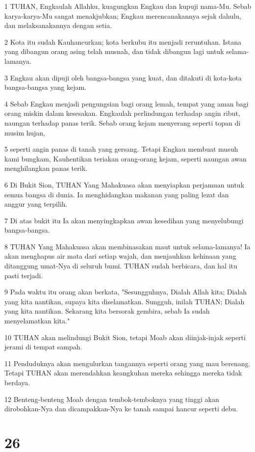 \par 1 TUHAN, Engkaulah Allahku, kuagungkan Engkau dan kupuji nama-Mu. Sebab karya-karya-Mu sangat menakjubkan; Engkau merencanakannya sejak dahulu, dan melaksanakannya dengan setia.
\par 2 Kota itu sudah Kauhancurkan; kota berkubu itu menjadi reruntuhan. Istana yang dibangun orang asing telah musnah, dan tidak dibangun lagi untuk selama-lamanya.
\par 3 Engkau akan dipuji oleh bangsa-bangsa yang kuat, dan ditakuti di kota-kota bangsa-bangsa yang kejam.
\par 4 Sebab Engkau menjadi pengungsian bagi orang lemah, tempat yang aman bagi orang miskin dalam kesesakan. Engkaulah perlindungan terhadap angin ribut, naungan terhadap panas terik. Sebab orang kejam menyerang seperti topan di musim hujan,
\par 5 seperti angin panas di tanah yang gersang. Tetapi Engkau membuat musuh kami bungkam, Kauhentikan teriakan orang-orang kejam, seperti naungan awan menghilangkan panas terik.
\par 6 Di Bukit Sion, TUHAN Yang Mahakuasa akan menyiapkan perjamuan untuk semua bangsa di dunia. Ia menghidangkan makanan yang paling lezat dan anggur yang terpilih.
\par 7 Di atas bukit itu Ia akan menyingkapkan awan kesedihan yang menyelubungi bangsa-bangsa.
\par 8 TUHAN Yang Mahakuasa akan membinasakan maut untuk selama-lamanya! Ia akan menghapus air mata dari setiap wajah, dan menjauhkan kehinaan yang ditanggung umat-Nya di seluruh bumi. TUHAN sudah berbicara, dan hal itu pasti terjadi.
\par 9 Pada waktu itu orang akan berkata, "Sesungguhnya, Dialah Allah kita; Dialah yang kita nantikan, supaya kita diselamatkan. Sungguh, inilah TUHAN; Dialah yang kita nantikan. Sekarang kita bersorak gembira, sebab Ia sudah menyelamatkan kita."
\par 10 TUHAN akan melindungi Bukit Sion, tetapi Moab akan diinjak-injak seperti jerami di tempat sampah.
\par 11 Penduduknya akan mengulurkan tangannya seperti orang yang mau berenang. Tetapi TUHAN akan merendahkan keangkuhan mereka sehingga mereka tidak berdaya.
\par 12 Benteng-benteng Moab dengan tembok-temboknya yang tinggi akan dirobohkan-Nya dan dicampakkan-Nya ke tanah sampai hancur seperti debu.

\chapter{26}

